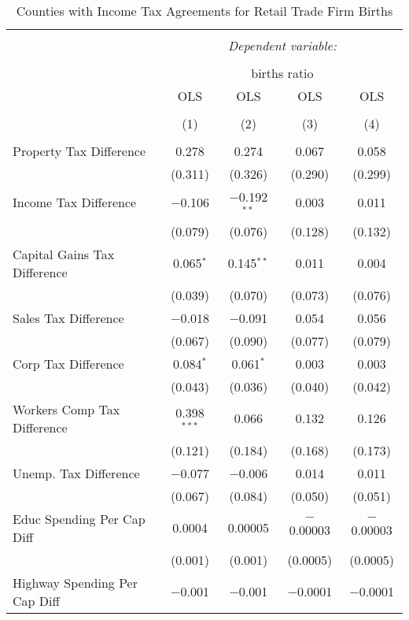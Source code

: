 
\begin{table}[!htbp] \centering 
  \caption{Counties with Income Tax Agreements for  Retail Trade Firm Births} 
  \label{44-45rd} 
\begin{tabular}{@{\extracolsep{5pt}}lcccc} 
\\[-1.8ex]\hline 
\hline \\[-1.8ex] 
 & \multicolumn{4}{c}{\textit{Dependent variable:}} \\ 
\cline{2-5} 
\\[-1.8ex] & \multicolumn{4}{c}{births ratio} \\ 
 & OLS & OLS & OLS & OLS \\ 
\\[-1.8ex] & (1) & (2) & (3) & (4)\\ 
\hline \\[-1.8ex] 
 Property Tax Difference & 0.278 & 0.274 & 0.067 & 0.058 \\ 
  & (0.311) & (0.326) & (0.290) & (0.299) \\ 
  Income Tax Difference & $-$0.106 & $-$0.192$^{**}$ & 0.003 & 0.011 \\ 
  & (0.079) & (0.076) & (0.128) & (0.132) \\ 
  Capital Gains Tax Difference & 0.065$^{*}$ & 0.145$^{**}$ & 0.011 & 0.004 \\ 
  & (0.039) & (0.070) & (0.073) & (0.076) \\ 
  Sales Tax Difference & $-$0.018 & $-$0.091 & 0.054 & 0.056 \\ 
  & (0.067) & (0.090) & (0.077) & (0.079) \\ 
  Corp Tax Difference & 0.084$^{*}$ & 0.061$^{*}$ & 0.003 & 0.003 \\ 
  & (0.043) & (0.036) & (0.040) & (0.042) \\ 
  Workers Comp Tax Difference & 0.398$^{***}$ & 0.066 & 0.132 & 0.126 \\ 
  & (0.121) & (0.184) & (0.168) & (0.173) \\ 
  Unemp. Tax Difference & $-$0.077 & $-$0.006 & 0.014 & 0.011 \\ 
  & (0.067) & (0.084) & (0.050) & (0.051) \\ 
  Educ Spending Per Cap Diff & 0.0004 & 0.00005 & $-$0.00003 & $-$0.00003 \\ 
  & (0.001) & (0.001) & (0.0005) & (0.0005) \\ 
  Highway Spending Per Cap Diff & $-$0.001 & $-$0.001 & $-$0.0001 & $-$0.0001 \\ 

\end{tabular}
\end{table}
